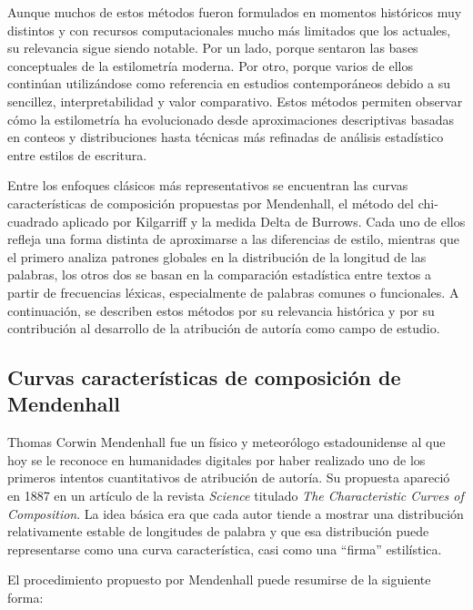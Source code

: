 \documentclass[IB]{TFUOC}%
\begin{document}
Aunque muchos de estos métodos fueron formulados en momentos históricos muy distintos y con recursos computacionales mucho más limitados que los actuales, su relevancia sigue siendo notable. Por un lado, porque sentaron las bases conceptuales de la estilometría moderna. Por otro, porque varios de ellos continúan utilizándose como referencia en estudios contemporáneos debido a su sencillez, interpretabilidad y valor comparativo\cite{stamatatos2009survey}. Estos métodos permiten observar cómo la estilometría ha evolucionado desde aproximaciones descriptivas basadas en conteos y distribuciones hasta técnicas más refinadas de análisis estadístico entre estilos de escritura.

Entre los enfoques clásicos más representativos se encuentran las curvas características de composición propuestas por Mendenhall, el método del chi-cuadrado aplicado por Kilgarriff y la medida Delta de Burrows. Cada uno de ellos refleja una forma distinta de aproximarse a las diferencias de estilo, mientras que el primero analiza patrones globales en la distribución de la longitud de las palabras, los otros dos se basan en la comparación estadística entre textos a partir de frecuencias léxicas, especialmente de palabras comunes o funcionales. A continuación, se describen estos métodos por su relevancia histórica y por su contribución al desarrollo de la atribución de autoría como campo de estudio.

\subsection{Curvas características de composición de Mendenhall}

Thomas Corwin Mendenhall fue un físico y meteorólogo estadounidense al que hoy se le reconoce en humanidades digitales por haber realizado uno de los primeros intentos cuantitativos de atribución de autoría. Su propuesta apareció en 1887 en un artículo de la revista \textit{Science} titulado \textit{The Characteristic Curves of Composition}\cite{mendenhall1887characteristic}. La idea básica era que cada autor tiende a mostrar una distribución relativamente estable de longitudes de palabra y que esa distribución puede representarse como una curva característica, casi como una ``firma'' estilística.

El procedimiento propuesto por Mendenhall puede resumirse de la siguiente forma:
\end{document}
